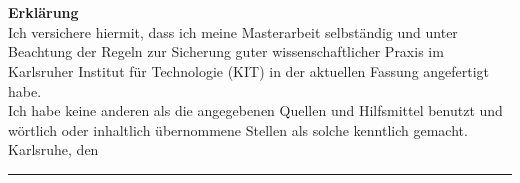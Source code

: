\chapter*{}
\begin{flushleft}
\vspace{5cm}
\textbf{Erklärung}\\[0,5cm]
Ich versichere hiermit, dass ich meine Masterarbeit selbständig und unter Beachtung der Regeln zur Sicherung guter wissenschaftlicher Praxis im Karlsruher Institut für Technologie (KIT) in der aktuellen Fassung angefertigt habe. \\
Ich habe keine anderen als die angegebenen Quellen und Hilfsmittel benutzt und wörtlich oder inhaltlich übernommene Stellen als solche kenntlich gemacht.\\[1cm]

Karlsruhe, den \abgabe\\[2cm]

\rule{5cm}{0.4pt} \\

\diplomand

\end{flushleft}
